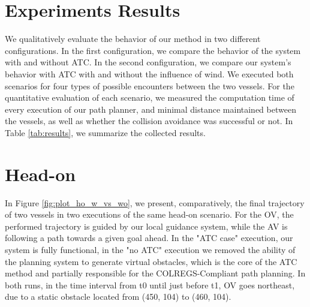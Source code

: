     \section{Experiments Results}

        We qualitatively evaluate the behavior of our method in two different configurations. In the first configuration, we compare the behavior of the system with and without \ac{ATC}.  In the second configuration, we compare our system's behavior with \ac{ATC} with and without the influence of wind. We executed both scenarios for four types of possible encounters between the two vessels. For the quantitative evaluation of each scenario, we measured the computation time of every execution of our path planner, and minimal distance maintained between the vessels, as well as whether the collision avoidance was successful or not. In Table \ref{tab:results}, we summarize the collected results.
        
        \section{Head-on}

        
        In Figure \ref{fig:plot_ho_w_vs_wo}, we present, comparatively, the final trajectory of two vessels in two executions of the same head-on scenario. For the \ac{OV}, the performed trajectory is guided by our local guidance system, while the \ac{AV} is following a path towards a given goal ahead. In the "ATC case" execution, our system is fully functional, in the "no ATC" execution we removed the ability of the planning system to generate virtual obstacles, which is the core of the \ac{ATC} method and partially responsible for the \ac{COLREGS}-Compliant path planning. In both runs, in the time interval from t0 until just before t1, \ac{OV} goes northeast, due to a static obstacle located from (450, 104) to (460, 104). 
        
